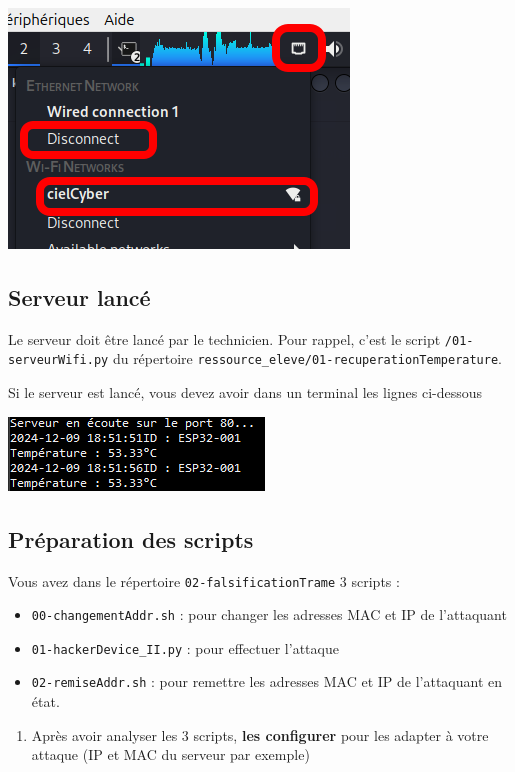 \documentclass[french, 12pt]{article}%
\newcommand{\itemE}{\item[$\bullet$]}
\begin{document}
\begin{center}
\includegraphics[scale=0.7]{./ressource/wifiDebutFalsification}
\end{center}

\subsection{Serveur lancé}
\label{srvLance}

Le serveur doit être lancé par le technicien. Pour rappel, c'est le script \verb?/01-serveurWifi.py? du répertoire \verb?ressource_eleve/01-recuperationTemperature?. 

Si le serveur est lancé, vous devez avoir dans un terminal les lignes ci-dessous

\begin{center}
\includegraphics[scale=0.7]{./ressource/serveurLance.png}
\end{center}


\subsection{Préparation des scripts}
\label{prepaScript}

Vous avez dans le répertoire \verb?02-falsificationTrame? 3 scripts :   
\begin{itemize}
\itemE \verb?00-changementAddr.sh? : pour changer les adresses MAC et IP de l'attaquant
\itemE \verb?01-hackerDevice_II.py? : pour effectuer l'attaque
\itemE \verb?02-remiseAddr.sh? : pour remettre les adresses MAC et IP de l'attaquant en état. 
\end{itemize}

\begin{enumerate}[resume]
\item Après avoir analyser les 3 scripts, \textbf{les configurer} pour les adapter à votre attaque (IP et MAC du serveur par exemple)
\end{enumerate}
\end{document}
